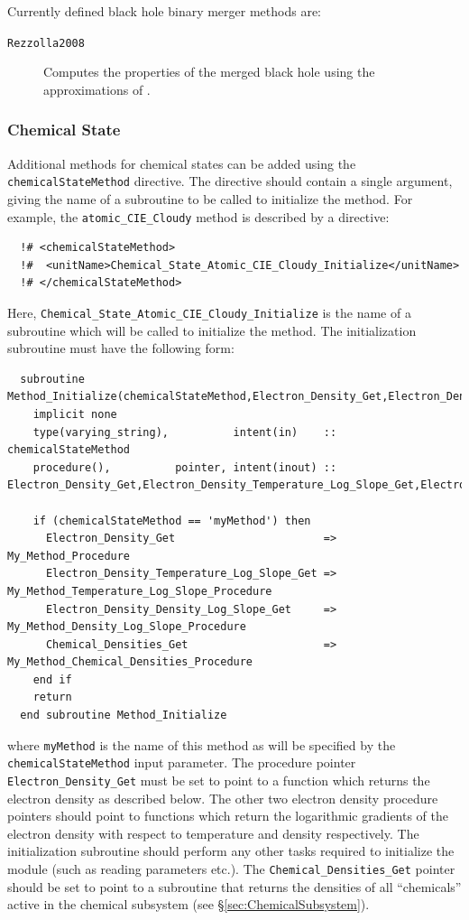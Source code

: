 Currently defined black hole binary merger methods are:
\begin{description}
 \item [{\tt Rezzolla2008}] Computes the properties of the merged black hole using the approximations of \cite{rezzolla_final_2008}.
\end{description}

\subsubsection{Chemical State}\label{sec:ChemicalStateMethods}

Additional methods for chemical states can be added using the {\tt chemicalStateMethod} directive. The directive should contain a single argument, giving the name of a subroutine to be called to initialize the method. For example, the {\tt atomic\_CIE\_Cloudy} method is described by a directive:
\begin{verbatim}
  !# <chemicalStateMethod>
  !#  <unitName>Chemical_State_Atomic_CIE_Cloudy_Initialize</unitName>
  !# </chemicalStateMethod>
\end{verbatim}
Here, {\tt Chemical\_State\_Atomic\_CIE\_Cloudy\_Initialize} is the name of a subroutine which will be called to initialize the method. The initialization subroutine must have the following form:
\begin{verbatim}
  subroutine Method_Initialize(chemicalStateMethod,Electron_Density_Get,Electron_Density_Temperature_Log_Slope_Get,Electron_Density_Density_Log_Slope_Get,Chemical_Densities_Get)
    implicit none
    type(varying_string),          intent(in)    :: chemicalStateMethod
    procedure(),          pointer, intent(inout) :: Electron_Density_Get,Electron_Density_Temperature_Log_Slope_Get,Electron_Density_Density_Log_Slope_Get
    
    if (chemicalStateMethod == 'myMethod') then
      Electron_Density_Get                       => My_Method_Procedure
      Electron_Density_Temperature_Log_Slope_Get => My_Method_Temperature_Log_Slope_Procedure
      Electron_Density_Density_Log_Slope_Get     => My_Method_Density_Log_Slope_Procedure
      Chemical_Densities_Get                     => My_Method_Chemical_Densities_Procedure
    end if
    return
  end subroutine Method_Initialize
\end{verbatim}
where {\tt myMethod} is the name of this method as will be specified by the {\tt chemicalStateMethod} input parameter. The procedure pointer {\tt Electron\_Density\_Get} must be set to point to a function which returns the electron density as described below. The other two electron density procedure pointers should point to functions which return the logarithmic gradients of the electron density with respect to temperature and density respectively. The initialization subroutine should perform any other tasks required to initialize the module (such as reading parameters etc.). The {\tt Chemical\_Densities\_Get} pointer should be set to point to a subroutine that returns the densities of all ``chemicals'' active in the chemical subsystem (see \S\ref{sec:ChemicalSubsystem}).

